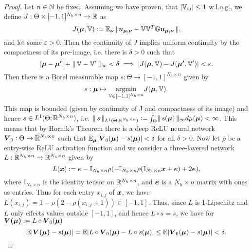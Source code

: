 \begin{proof}
    Let $n \in \mathbb{N}$ be fixed. Assuming we have proven, that $\vert \mathbb{V}_{ij} \vert \leq 1$ w.l.o.g., we define $J: \Theta \times [-1, 1]^{N_h \times n} \to \mathbb{R}$ as 
    \begin{equation}
        J(\boldsymbol{\mu}, \mathbb{V}) := \mathbb{E}_{\boldsymbol{\nu}}\lVert \, \boldsymbol{u_{\mu, \nu}} - \mathbb{V} \mathbb{V}^T \mathbb{G} \boldsymbol{u_{\mu, \nu}} \, \rVert,
    \end{equation}
    and let some $\varepsilon > 0$. Then the continuity of $J$ implies uniform continuity by the compactness of its pre-image, i.e. there is $\delta > 0$ such that
    \begin{equation*}
        \vert \boldsymbol{\mu} - \boldsymbol{\mu'} \vert + \lVert \, \mathbb{V} - \mathbb{V}' \, \rVert_{\infty} < \delta \implies \vert J(\boldsymbol{\mu}, \mathbb{V}) - J(\boldsymbol{\mu'}, \mathbb{V}') \vert < \varepsilon.
    \end{equation*}
    Then there is a Borel measurable map $s: \Theta \to [-1, 1]^{N_h \times n}$ given by
    \begin{equation*}
        s: \boldsymbol{\mu} \mapsto \underset{{\mathbb{V} \in [-1, 1]^{N_h \times n}}}{\text{argmin}} J(\boldsymbol{\mu}, \mathbb{V}).
    \end{equation*}
    This map is bounded (given by continuity of J and compactness of its image) and hence $s \in L^1(\Theta; \mathbb{R}^{N_h \times n})$, i.e. $\lVert \, s \, \rVert_{L^1(\Theta; \mathbb{R}^{N_h \times n})} := \int_{\Theta} \lVert \, s(\boldsymbol{\mu}) \, \rVert_{\infty} d \mu{(\boldsymbol{\mu})} < \infty$. This means that by Hornik's Theorem \cite{Existence_of_ReLU_NN} there is a deep ReLU neural network $\boldsymbol{V}_0: \Theta \to \mathbb{R}^{N_h \times n}$ such that $\mathbb{E}_{\boldsymbol{\mu}} \vert \boldsymbol{V}_0(\boldsymbol{\mu}) - s(\boldsymbol{\mu}) \vert < \delta$ for all $\delta > 0$. Now let $\rho$ be a entry-wise ReLU activation function and we consider a three-layered network $L: \mathbb{R}^{N_h \times n} \to \mathbb{R}^{N_h \times n}$ given by
    \begin{equation*}
        L(\boldsymbol{x}) := \boldsymbol{e} - \mathbb{I}_{N_h \times n} \rho(- \mathbb{I}_{N_h \times n} \rho(\mathbb{I}_{N_h \times n} \boldsymbol{x} + \boldsymbol{e}) + 2 \boldsymbol{e}),
    \end{equation*}
    where $\mathbb{I}_{N_h \times n}$ is the identity tensor on $\mathbb{R}^{N_h \times n}$, and $\boldsymbol{e}$ is a $N_h \times n$ matrix with ones as entries. Thus for each entry $x_{i,j}$ of $\boldsymbol{x}$, we have $L(x_{i, j}) = 1 - \rho(2 - \rho(x_{i,j} + 1)) \in [-1, 1]$. Thus, since $L$ is 1-Lipschitz and $L$ only effects values outside $[-1, 1]$, and hence $L \circ s = s$, we have for $\boldsymbol{V(\mu)} := L \circ \boldsymbol{V}_0 (\boldsymbol{\mu})$
    \begin{equation*}
        \E \vert \bs{V(\mu)} - s(\bs{\mu}) \vert = \E \vert L \circ \bs{V}_0(\bs{\mu}) - L \circ s(\bs{\mu}) \vert \leq \E \vert \bs{V}_0(\bs{\mu}) - s(\bs{\mu}) \vert < \delta.

\end{equation*}
\end{proof}
